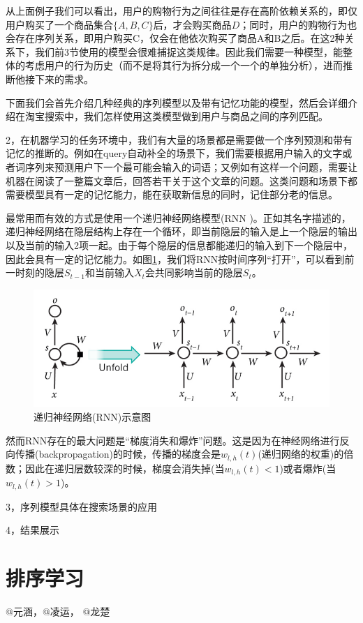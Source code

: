 从上面例子我们可以看出，用户的购物行为之间往往是存在高阶依赖关系的，即仅用户购买了一个商品集合$\{A, B, C\}$后，才会购买商品$D$；同时，用户的购物行为也会存在序列关系，即用户购买C，仅会在他依次购买了商品A和B之后。在这2种关系下，我们前3节使用的模型会很难捕捉这类规律。因此我们需要一种模型，能整体的考虑用户的行为历史（而不是将其行为拆分成一个一个的单独分析），进而推断他接下来的需求。

下面我们会首先介绍几种经典的序列模型以及带有记忆功能的模型，然后会详细介绍在淘宝搜索中，我们怎样使用这类模型做到用户与商品之间的序列匹配。

2，在机器学习的任务环境中，我们有大量的场景都是需要做一个序列预测和带有记忆的推断的。例如在query自动补全的场景下，我们需要根据用户输入的文字或者词序列来预测用户下一个最可能会输入的词语；又例如有这样一个问题，需要让机器在阅读了一整篇文章后，回答若干关于这个文章的问题。这类问题和场景下都需要模型具有一定的记忆能力，能在获取新信息的同时，记住部分老的信息。

最常用而有效的方式是使用一个递归神经网络模型(RNN \cite{4,5})。正如其名字描述的，递归神经网络在隐层结构上存在一个循环，即当前隐层的输入是上一个隐层的输出以及当前的输入2项一起。由于每个隐层的信息都能递归的输入到下一个隐层中，因此会具有一定的记忆能力。如图\ref{fig:RNN}，我们将RNN按时间序列“打开”，可以看到前一时刻的隐层$S_{t-1}$和当前输入$X_t$会共同影响当前的隐层$S_{t}$。

\begin{figure}
	\centering
	\includegraphics[width=0.8\linewidth]{"fig/RNN"}
	\caption{递归神经网络(RNN)示意图}
	\label{fig:RNN}
\end{figure}	

然而RNN存在的最大问题是“梯度消失和爆炸”问题。这是因为在神经网络进行反向传播(backpropagation)的时候，传播的梯度会是$w_{l,h}(t)$(递归网络的权重)的倍数；因此在递归层数较深的时候，梯度会消失掉(当$w_{l,h}(t)<1$)或者爆炸(当$w_{l,h}(t)>1$)。

3，序列模型具体在搜索场景的应用

4，结果展示
	
\section{排序学习}
	@元涵，@凌运， @龙楚
